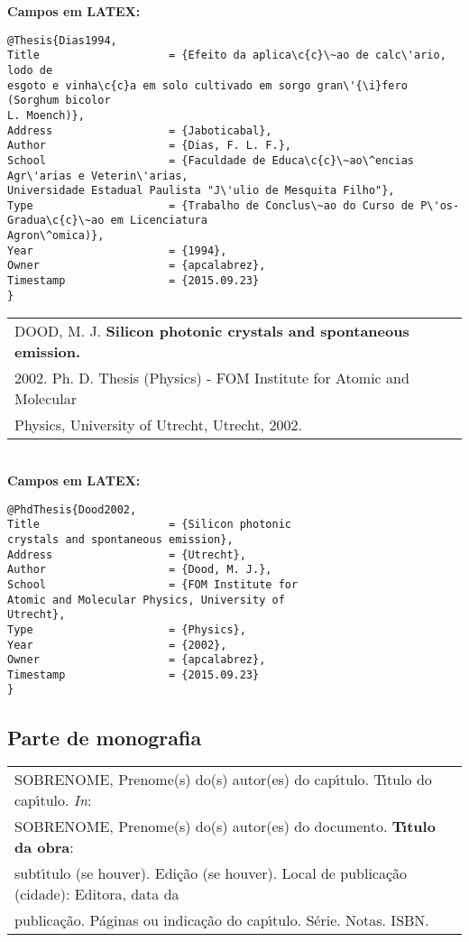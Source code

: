 \textbf{Campos em LATEX:} 

\begin{verbatim}
@Thesis{Dias1994,
Title                    = {Efeito da aplica\c{c}\~ao de calc\'ario, lodo de 
esgoto e vinha\c{c}a em solo cultivado em sorgo gran\'{\i}fero (Sorghum bicolor 
L. Moench)},
Address                  = {Jaboticabal},
Author                   = {Dias, F. L. F.},
School                   = {Faculdade de Educa\c{c}\~ao\^encias Agr\'arias e Veterin\'arias, 
Universidade Estadual Paulista "J\'ulio de Mesquita Filho"},
Type                     = {Trabalho de Conclus\~ao do Curso de P\'os-Gradua\c{c}\~ao em Licenciatura
Agron\^omica)},
Year                     = {1994},
Owner                    = {apcalabrez},
Timestamp                = {2015.09.23}
}
\end{verbatim}


\begin{tabular}{|l|c|} \hline
	DOOD, M. J. \textbf{Silicon photonic crystals and spontaneous emission.} \\ 2002.
	 Ph. D. Thesis (Physics) - FOM Institute for Atomic and Molecular
	 \\ Physics, University of Utrecht, Utrecht, 2002.    \\\hline
\end{tabular} \\

\textbf{Campos em LATEX:} \\

\begin{verbatim}
@PhdThesis{Dood2002,
Title                    = {Silicon photonic
crystals and spontaneous emission},
Address                  = {Utrecht},
Author                   = {Dood, M. J.},
School                   = {FOM Institute for
Atomic and Molecular Physics, University of
Utrecht},
Type                     = {Physics},
Year                     = {2002},
Owner                    = {apcalabrez},
Timestamp                = {2015.09.23}
}
\end{verbatim}

\subsection{Parte de monografia}	

\begin{tabular}{|l|c|} \hline
	SOBRENOME, Prenome(s) do(s) autor(es) do cap\'{\i}tulo. T\'{\i}tulo do cap\'{\i}tulo. \textit{In}: \\ SOBRENOME, Prenome(s) do(s) autor(es) do documento. \textbf{T\'{\i}tulo da obra}: \\ subt\'{\i}tulo (se houver). Edi\c{c}\~ao (se houver). Local de publica\c{c}\~ao (cidade): Editora, data da\\ publica\c{c}\~ao. P\'aginas ou indica\c{c}\~ao do cap\'{\i}tulo. S\'erie. Notas. ISBN.     \\\hline
\end{tabular} \\

